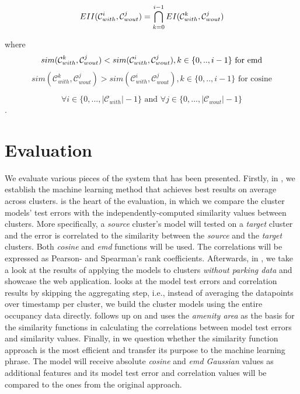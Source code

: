 \documentclass{ws-ijait}
\newcommand{\cmmnt}[1]{\ignorespaces}
\begin{document}
	\begin{equation}
	EII(\mathcal{C}_{with}^i,\mathcal{C}_{wout}^j) = \bigcap_{k=0}^{i-1} EI(\mathcal{C}_{with}^k,\mathcal{C}_{wout}^j) \\
	\end{equation}
	
	where
	\begin{equation}
	sim(\mathcal{C}_{with}^k,\mathcal{C}_{wout}^j) < sim(\mathcal{C}_{with}^i,\mathcal{C}_{wout}^j), k \in \{0,..,i - 1\} \text{ for emd}\\
	\end{equation}
	\begin{equation}
	sim(\mathcal{C}_{with}^k,\mathcal{C}_{wout}^j) > sim(\mathcal{C}_{with}^i,\mathcal{C}_{wout}^j), k \in \{0,..,i - 1\} \text{ for cosine} 
	\end{equation}
	
	$$\forall i \in \{0,...,|\mathcal{C}_{with}|-1\} \text{ and } \forall j \in \{0,...,|\mathcal{C}_{wout}|-1\}$$.
		
	\section{Evaluation}
	We evaluate various pieces of the system that has been presented. Firstly, in \cmmnt{\cref{evaluation:best_model}}, we  establish the machine learning method that achieves best results on average across clusters. \cmmnt{\Cref{evaluation:similarity_vs_estimation_sec}} is the heart of the evaluation, in which we compare the cluster models' test errors with the independently-computed similarity values between clusters. More specifically, a \textit{source} cluster's model will tested on a \textit{target} cluster and the error is correlated to the similarity between the \textit{source} and the \textit{target} clusters. Both \textit{cosine} and \textit{emd} functions will be used. The correlations will be expressed as Pearson- and Spearman's rank coefficients. Afterwards, in \cmmnt{\cref{evaluation:estimations_cwout}}, we take a look at the results of applying the models to clusters \textit{without parking data} and showcase the web application. \cmmnt{\Cref{evaluation:entire_datapoints}} looks at the model test errors and correlation results by skipping the aggregating step, i.e., instead of averaging the datapoints over timestamp per cluster, we build the cluster models using the entire occupancy data directly. \cmmnt{\Cref{evaluation:amenity_area}} follows up on \cmmnt{\cref{experimental_setup:amenity_area}} and uses the \textit{amenity area} as the basis for the similarity functions in calculating the correlations between model test errors and similarity values. Finally, in \cmmnt{\cref{evaluation:machine_learning_better}} we question whether the similarity function approach is the most efficient and transfer its purpose to the machine learning phrase. The model will receive absolute \textit{cosine} and \textit{emd Gaussian} values as additional features and its model test error and correlation values will be compared to the ones from the original approach.
	
\end{document}
